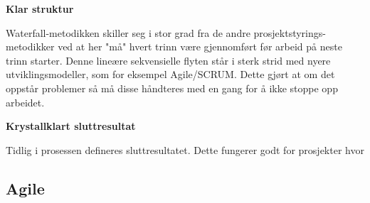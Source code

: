 \textbf{Klar struktur}

Waterfall-metodikken skiller seg i stor grad fra de andre prosjektstyrings-metodikker ved at her "må" hvert trinn være gjennomført før arbeid på neste trinn starter. Denne lineære sekvensielle flyten står i sterk strid med nyere utviklingsmodeller, som for eksempel Agile/SCRUM. Dette gjørt at om det oppstår problemer så må disse håndteres med en gang for å ikke stoppe opp arbeidet. 

\textbf{Krystallklart sluttresultat}

Tidlig i prosessen defineres sluttresultatet. Dette fungerer godt for prosjekter hvor


\subsection{Agile}











